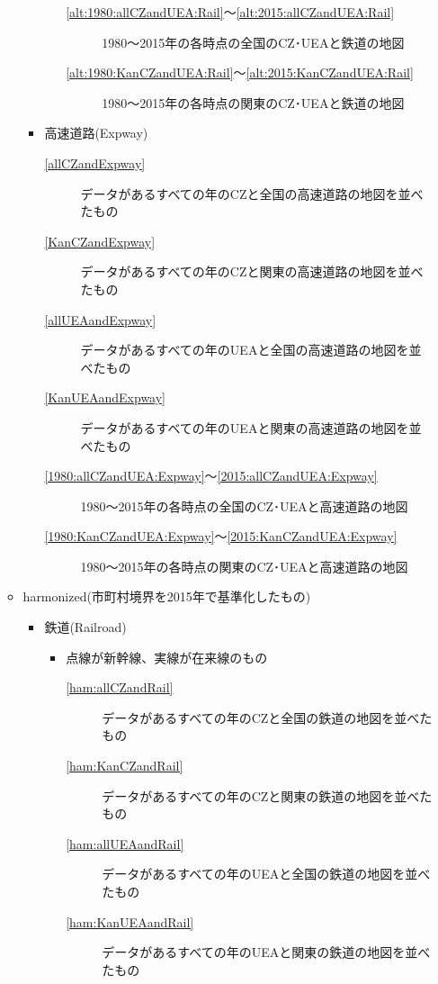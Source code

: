 \documentclass{ltjsarticle}
\begin{document}
\begin{itemize}
\begin{itemize}
\begin{itemize}
\begin{itemize}
\begin{description}
          \item[\ref{alt:1980:allCZandUEA:Rail}～\ref{alt:2015:allCZandUEA:Rail}] 1980～2015年の各時点の全国のCZ･UEAと鉄道の地図
          \item[\ref{alt:1980:KanCZandUEA:Rail}～\ref{alt:2015:KanCZandUEA:Rail}] 1980～2015年の各時点の関東のCZ･UEAと鉄道の地図
        \end{description}
      \end{itemize}      
      \item 高速道路(Expway)
      \begin{description}
        \item[\ref{allCZandExpway}] データがあるすべての年のCZと全国の高速道路の地図を並べたもの
        \item[\ref{KanCZandExpway}] データがあるすべての年のCZと関東の高速道路の地図を並べたもの
        \item[\ref{allUEAandExpway}] データがあるすべての年のUEAと全国の高速道路の地図を並べたもの
        \item[\ref{KanUEAandExpway}] データがあるすべての年のUEAと関東の高速道路の地図を並べたもの
        \item[\ref{1980:allCZandUEA:Expway}～\ref{2015:allCZandUEA:Expway}] 1980～2015年の各時点の全国のCZ･UEAと高速道路の地図
        \item[\ref{1980:KanCZandUEA:Expway}～\ref{2015:KanCZandUEA:Expway}] 1980～2015年の各時点の関東のCZ･UEAと高速道路の地図
      \end{description}
    \end{itemize}
    \item harmonized(市町村境界を2015年で基準化したもの)
    \begin{itemize}
      \item 鉄道(Railroad)
      \begin{itemize}
        \item 点線が新幹線、実線が在来線のもの
        \begin{description}
          \item[\ref{ham:allCZandRail}] データがあるすべての年のCZと全国の鉄道の地図を並べたもの
          \item[\ref{ham:KanCZandRail}] データがあるすべての年のCZと関東の鉄道の地図を並べたもの
          \item[\ref{ham:allUEAandRail}] データがあるすべての年のUEAと全国の鉄道の地図を並べたもの
          \item[\ref{ham:KanUEAandRail}] データがあるすべての年のUEAと関東の鉄道の地図を並べたもの

\end{description}
\end{itemize}
\end{itemize}
\end{itemize}
\end{itemize}
\end{document}
